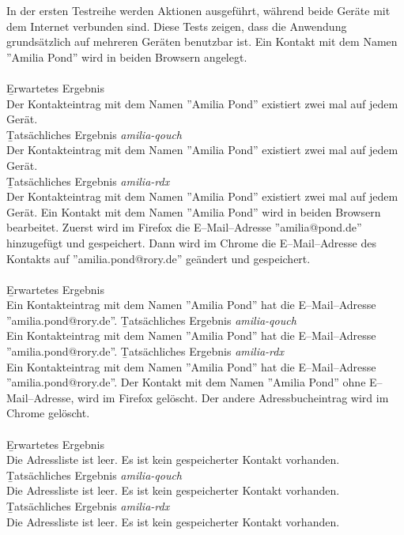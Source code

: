 In der ersten Testreihe werden Aktionen ausgeführt, während beide Geräte mit dem Internet verbunden sind.
Diese Tests zeigen, dass die Anwendung grundsätzlich auf mehreren Geräten benutzbar ist.
%
Ein Kontakt mit dem Namen ''Amilia Pond'' wird in beiden Browsern angelegt.\\\\
\b{Erwartetes Ergebnis}\\
Der Kontakteintrag mit dem Namen ''Amilia Pond'' existiert zwei mal auf jedem Gerät.\\
\b{Tatsächliches Ergebnis \it{amilia-qouch}}\\
Der Kontakteintrag mit dem Namen ''Amilia Pond'' existiert zwei mal auf jedem Gerät.\\
\b{Tatsächliches Ergebnis \it{amilia-rdx}}\\
Der Kontakteintrag mit dem Namen ''Amilia Pond'' existiert zwei mal auf jedem Gerät.
%
Ein Kontakt mit dem Namen ''Amilia Pond'' wird in beiden Browsern bearbeitet.
Zuerst wird im Firefox die E--Mail--Adresse ''amilia@pond.de'' hinzugefügt und gespeichert.
Dann wird im Chrome die E--Mail--Adresse des Kontakts auf ''amilia.pond@rory.de'' geändert und gespeichert.\\\\
\b{Erwartetes Ergebnis}\\
Ein Kontakteintrag mit dem Namen ''Amilia Pond'' hat die E--Mail--Adresse ''amilia.pond@rory.de''.
\b{Tatsächliches Ergebnis \it{amilia-qouch}}\\
Ein Kontakteintrag mit dem Namen ''Amilia Pond'' hat die E--Mail--Adresse ''amilia.pond@rory.de''.
\b{Tatsächliches Ergebnis \it{amilia-rdx}}\\
Ein Kontakteintrag mit dem Namen ''Amilia Pond'' hat die E--Mail--Adresse ''amilia.pond@rory.de''.
%
Der Kontakt mit dem Namen ''Amilia Pond'' ohne E--Mail--Adresse, wird im Firefox gelöscht. Der andere Adressbucheintrag wird im Chrome gelöscht.\\\\
\b{Erwartetes Ergebnis}\\
Die Adressliste ist leer. Es ist kein gespeicherter Kontakt vorhanden.\\
\b{Tatsächliches Ergebnis \it{amilia-qouch}}\\
Die Adressliste ist leer. Es ist kein gespeicherter Kontakt vorhanden.\\
\b{Tatsächliches Ergebnis \it{amilia-rdx}}\\
Die Adressliste ist leer. Es ist kein gespeicherter Kontakt vorhanden.